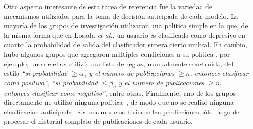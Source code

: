 Otro aspecto interesante de esta tarea de referencia fue la variedad de mecanismos utilizados para la toma de decisión anticipada de cada modelo.
La mayoría de los grupos de investigación \cite{malam2017irit,trotzek2017linguistic,sadeque2017uarizona,villatorouam,errecaldetemporal,almeida2017detecting} utilizaron una política simple en la que, de la misma forma que en Losada \emph{et al.}\cite{losada2016test}, un usuario es clasificado como depresivo en cuanto la probabilidad de salida del clasificador supera cierto umbral. 
En cambio, hubo algunos grupos que agregaron múltiples condiciones a su política \cite{malam2017irit,trotzek2017linguistic,errecaldetemporal}, por ejemplo, uno de ellos \cite{trotzek2017linguistic} utilizó una lista de reglas, manualmente construida, del estilo \emph{``si probabilidad $\geq\alpha_n$ y el número de publicaciones $\geq n$, entonces clasificar como positivo'', ``si probabilidad $\leq\beta_n$ y el número de publicaciones $\geq n$, entonces clasificar como negativo''}, entre otras.
Finalmente, uno de los grupos directamente no utilizó ninguna política~\cite{fariasuach}, de modo que no se realizó ninguna clasificación anticipada --\emph{i.e.} sus modelos hicieron las predicciones sólo luego de procesar el historial completo de publicaciones de cada usuario. %



